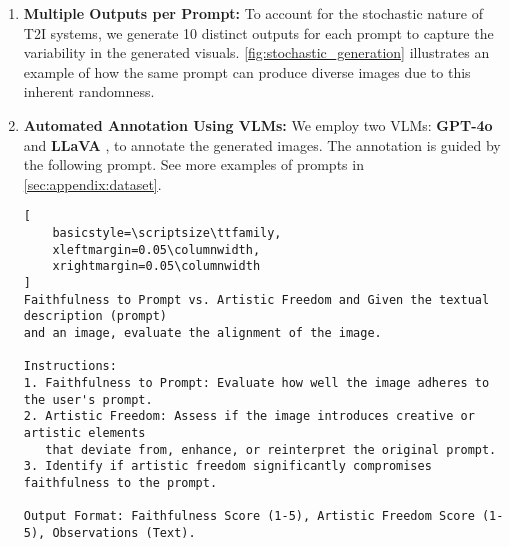 \begin{enumerate}
    \item \textbf{Multiple Outputs per Prompt:}  To account for the stochastic nature of T2I systems, we generate 10 distinct outputs for each prompt to capture the variability in the generated visuals. 
    \cref{fig:stochastic_generation} illustrates an example of how the same prompt can produce diverse images due to this inherent randomness.

    
    \item \textbf{Automated Annotation Using VLMs:}  
    We employ two VLMs: \textbf{GPT-4o} \cite{openai2023gpt4} and \textbf{LLaVA} \cite{liu2023visualinstruction}, to annotate the generated images. The annotation is guided by the following prompt. See more examples of prompts in \cref{sec:appendix:dataset}.  

\begin{lstlisting}[
    basicstyle=\scriptsize\ttfamily,
    xleftmargin=0.05\columnwidth,
    xrightmargin=0.05\columnwidth
]
Faithfulness to Prompt vs. Artistic Freedom and Given the textual description (prompt) 
and an image, evaluate the alignment of the image.

Instructions:
1. Faithfulness to Prompt: Evaluate how well the image adheres to the user's prompt. 
2. Artistic Freedom: Assess if the image introduces creative or artistic elements 
   that deviate from, enhance, or reinterpret the original prompt. 
3. Identify if artistic freedom significantly compromises faithfulness to the prompt.

Output Format: Faithfulness Score (1-5), Artistic Freedom Score (1-5), Observations (Text).
\end{lstlisting}




\vspace{-2mm}
    

\end{enumerate}
